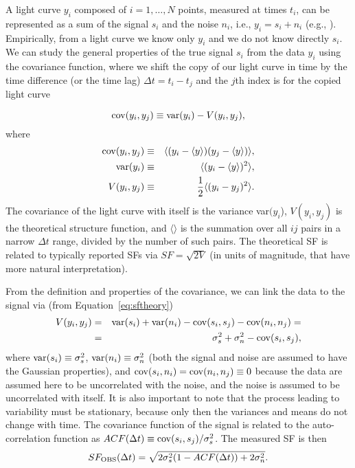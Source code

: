 \documentclass[twocolumn]{aastex6}
\begin{document}
A light curve $y_i$ composed of $i=1, \dots, N$ points, measured at times $t_i$, can be represented as a sum of the signal $s_i$ and the noise $n_i$, i.e., $y_i=s_i+n_i$
(e.g., \citealt{1981ApJS...45....1S, 1982ApJ...263..835S, 1989ApJ...343..874S,1992ApJ...398..169R,1992ApJ...385..404P,1992ApJ...385..416P}). Empirically, from a light curve we know only $y_i$
and we do not know directly $s_i$. 
We can study the general properties of the true signal $s_i$ from the data $y_i$ using the covariance function, where we shift the copy of our light curve in time by the time difference (or the time lag)
$\Delta t=t_i-t_j$ and the $j$th index is for the copied light curve

\begin{equation}
\label{eq:sftheory}
{\rm cov}(y_i, y_j) \equiv {\rm var}(y_i) - V(y_i, y_j),
\end{equation}
\noindent
where
\begin{eqnarray}
\label{eq:covgen}
{\rm cov}(y_i, y_j) &\equiv&  \langle( y_i-\langle y \rangle)(y_j-\langle y\rangle) \rangle,\\
{\rm var}(y_i) &\equiv& \langle (y_i-\langle y \rangle)^2 \rangle,\\
V(y_i, y_j) &\equiv& \frac{1}{2}\langle(y_i-y_j)^2\rangle.
\end{eqnarray}
\noindent
The covariance of the light curve with itself is the variance var$(y_i$), $V(y_i, y_j)$ is the theoretical structure function, and $\langle \rangle$
is the summation over all $ij$ pairs in a narrow $\Delta t$ range, divided by the number of such pairs. The theoretical
SF is related to typically reported SFs via $SF=\sqrt{2V}$ (in units of magnitude, that have more natural interpretation).

From the definition and properties of the covariance, we can link the data to the signal via (from Equation~\ref{eq:sftheory})
\begin{eqnarray}
V(y_i, y_j) &=& {\rm var}(s_i) + {\rm var}(n_i) - {\rm cov}(s_i, s_j) - {\rm cov}(n_i, n_j) = \nonumber \\
            &=& \sigma_s^2 + \sigma_n^2 - {\rm cov}(s_i, s_j),
\label{eq:SFtheory}
\end{eqnarray}
\noindent
where ${\rm var}(s_i)\equiv\sigma_s^2$, ${\rm var}(n_i)\equiv\sigma_n^2$ (both the signal and noise are assumed to have the Gaussian properties),
and ${\rm cov}(s_i, n_i)={\rm cov}(n_i, n_j)\equiv 0$ because
the data are assumed here to be uncorrelated with the noise, and the noise is assumed to be uncorrelated with itself.
It is also important to note that the process leading to variability must be stationary, because only then the variances and means do not change with time.
The covariance function of the signal is related to the auto-correlation function as $ACF(\Delta t)\equiv{\rm cov}(s_i, s_j)/\sigma_s^2$.
The measured SF is then
\begin{equation}
SF_{\rm OBS}(\Delta t) = \sqrt{2\sigma_s^2(1-ACF(\Delta t))+2\sigma_n^2}.
\end{equation}
\end{document}
